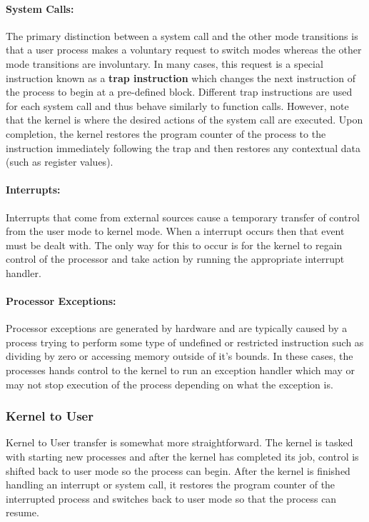 \documentclass[11pt, letterpaper]{article}
\begin{document}
\paragraph{System Calls:}The primary distinction between a system call and the other mode transitions is that a user process makes a voluntary request to switch modes whereas the other mode transitions are involuntary. In many cases, this request is a special instruction known as a \textbf{trap instruction} which changes the next instruction of the process to begin at a pre-defined block. Different trap instructions are used for each system call and thus behave similarly to function calls. However, note that the kernel is where the desired actions of the system call are executed. Upon completion, the kernel restores the program counter of the process to the instruction immediately following the trap and then restores any contextual data (such as register values).

\paragraph{Interrupts:}Interrupts that come from external sources cause a temporary transfer of control from the user mode to kernel 
mode. When a interrupt occurs then that event must be dealt with. The only way for this to occur is for the kernel to regain control 
of the processor and take action by running the appropriate interrupt handler. 
\paragraph{Processor Exceptions:} Processor exceptions are generated by hardware and are typically caused by a process trying to 
perform some type of undefined or restricted instruction such as dividing by zero or accessing memory outside of it's bounds. In 
these cases, the processes hands control to the kernel to run an exception handler which may or may not stop execution of the 
process depending on what the exception is.


\subsubsection{Kernel to User}
Kernel to User transfer is somewhat more straightforward. The kernel is tasked with starting new processes and after the kernel has 
completed its job, control is shifted back to user mode so the process can begin. After the kernel is finished handling an 
interrupt or system call, it restores the program counter of the interrupted process and switches back to user mode so that the process can resume.
\end{document}
